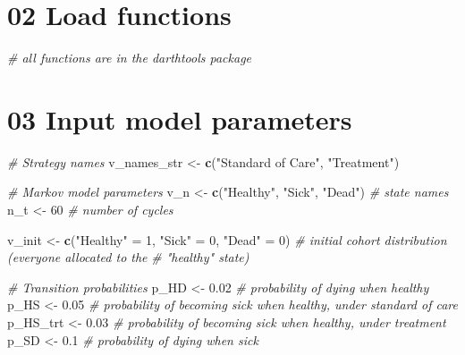\documentclass[]{article}
\newenvironment{Shaded}{\begin{snugshade}}{\end{snugshade}}
\newcommand{\KeywordTok}[1]{\textcolor[rgb]{0.13,0.29,0.53}{\textbf{#1}}}
\newcommand{\DecValTok}[1]{\textcolor[rgb]{0.00,0.00,0.81}{#1}}
\newcommand{\FloatTok}[1]{\textcolor[rgb]{0.00,0.00,0.81}{#1}}
\newcommand{\StringTok}[1]{\textcolor[rgb]{0.31,0.60,0.02}{#1}}
\newcommand{\CommentTok}[1]{\textcolor[rgb]{0.56,0.35,0.01}{\textit{#1}}}
\newcommand{\NormalTok}[1]{#1}
\begin{document}
\section{02 Load functions}\label{load-functions}

\begin{Shaded}
\begin{Highlighting}[]
\CommentTok{# all functions are in the darthtools package}
\end{Highlighting}
\end{Shaded}

\section{03 Input model parameters}\label{input-model-parameters}

\begin{Shaded}
\begin{Highlighting}[]
\CommentTok{# Strategy names}
\NormalTok{v_names_str <-}\StringTok{ }\KeywordTok{c}\NormalTok{(}\StringTok{"Standard of Care"}\NormalTok{, }\StringTok{"Treatment"}\NormalTok{)  }

\CommentTok{# Markov model parameters}
\NormalTok{v_n  <-}\StringTok{ }\KeywordTok{c}\NormalTok{(}\StringTok{"Healthy"}\NormalTok{, }\StringTok{"Sick"}\NormalTok{, }\StringTok{"Dead"}\NormalTok{)  }\CommentTok{# state names}
\NormalTok{n_t  <-}\StringTok{ }\DecValTok{60}                            \CommentTok{# number of cycles}

\NormalTok{v_init <-}\StringTok{ }\KeywordTok{c}\NormalTok{(}\StringTok{"Healthy"}\NormalTok{ =}\StringTok{ }\DecValTok{1}\NormalTok{,}
            \StringTok{"Sick"}\NormalTok{    =}\StringTok{ }\DecValTok{0}\NormalTok{,}
            \StringTok{"Dead"}\NormalTok{    =}\StringTok{ }\DecValTok{0}\NormalTok{)            }\CommentTok{# initial cohort distribution (everyone allocated to the }
                                      \CommentTok{# "healthy" state)}

\CommentTok{# Transition probabilities}
\NormalTok{p_HD      <-}\StringTok{ }\FloatTok{0.02}                     \CommentTok{# probability of dying when healthy}
\NormalTok{p_HS      <-}\StringTok{ }\FloatTok{0.05}                     \CommentTok{# probability of becoming sick when healthy, under standard of care}
\NormalTok{p_HS_trt  <-}\StringTok{ }\FloatTok{0.03}                     \CommentTok{# probability of becoming sick when healthy, under treatment}
\NormalTok{p_SD      <-}\StringTok{ }\FloatTok{0.1}                      \CommentTok{# probability of dying when sick}


\end{Highlighting}
\end{Shaded}
\end{document}
